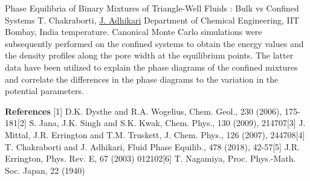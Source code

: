 \begin{abstract_online}{Phase Equilibria of Binary Mixtures of Triangle-Well Fluids : Bulk vs Confined Systems}{%
        T. Chakraborti, \underline{J. Adhikari}}{%
        \IStag}{%
        Department of Chemical Engineering, IIT Bombay, India}
temperature. Canonical Monte Carlo simulations were subsequently performed on the confined systems to obtain the energy values and the density profiles along the pore width at the equilibrium points. The latter data have been utilized to explain the phase diagrams of the confined mixtures and correlate the differences in the phase diagrams to the variation in the potential parameters. 
    
        \textbf{References} \newline{}[1] D.K. Dysthe and R.A. Wogelius, Chem. Geol., 230 (2006), 175-181\newline{}[2] S. Jana, J.K. Singh and S.K. Kwak, Chem. Phys., 130 (2009), 214707\newline{}[3] J. Mittal, J.R. Errington and T.M. Truskett, J. Chem. Phys., 126 (2007), 244708\newline{}[4] T. Chakraborti and J. Adhikari, Fluid Phase Equilib., 478 (2018), 42-57\newline{}[5] J.R. Errington, Phys. Rev. E, 67 (2003) 012102\newline{}[6] T. Nagamiya, Proc. Phys.-Math. Soc. Japan, 22 (1940)
    \end{abstract_online}
    